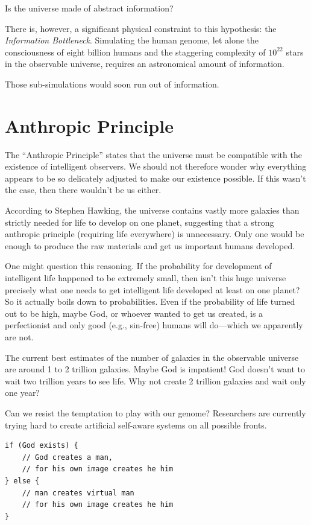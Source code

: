 Is the universe made of abstract information? 

There is, however, a significant physical constraint to this hypothesis: the \textit{Information Bottleneck}.
Simulating the human genome, let alone the consciousness of eight billion humans and the staggering complexity of $10^{22}$ stars in the observable universe, requires an astronomical amount of information. 

Those sub-simulations would soon run out of information.



\section{Anthropic Principle}

The ``Anthropic Principle'' states that the universe must be compatible with the existence of intelligent observers.
We should not therefore wonder why everything appears to be so delicately adjusted to make our existence possible.
If this wasn't the case, then there wouldn't be us either.

According to Stephen Hawking, the universe contains vastly more galaxies than strictly needed for life to develop on one planet, suggesting that a strong anthropic principle (requiring life everywhere) is unnecessary.
Only one would be enough to produce the raw materials and get us important humans developed.

One might question this reasoning. If the probability for development of intelligent life happened to be extremely small, then isn't this huge universe precisely what one needs to get intelligent life developed at least on one planet?
So it actually boils down to probabilities.
Even if the probability of life turned out to be high, maybe God, or whoever wanted to get us created, is a perfectionist and only good (e.g., sin-free) humans will do—which we apparently are not.

The current best estimates of the number of galaxies in the observable universe are around 1 to 2 trillion galaxies.
Maybe God is impatient! God doesn't want to wait two trillion years to see life. Why not create 2 trillion galaxies and wait only one year?

Can we resist the temptation to play with our genome? Researchers are currently trying hard to create artificial self-aware systems on all possible fronts.

\begin{verbatim}
if (God exists) {
    // God creates a man, 
    // for his own image creates he him
} else {
    // man creates virtual man 
    // for his own image creates he him
}
\end{verbatim}

